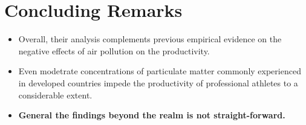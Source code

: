 \documentclass[../root]{subfiles}
\begin{document}
    \section{Concluding Remarks}

    \begin{itemize}
      \item Overall, their analysis complements previous empirical evidence on the negative effects of air pollution on the productivity.
      \item Even modetrate concentrations of particulate matter commonly experienced in developed countries impede the productivity of professional athletes to a considerable extent.
      \item \textbf{General the findings beyond the realm is not straight-forward.}
    \end{itemize}

    \biblio
\end{document}
